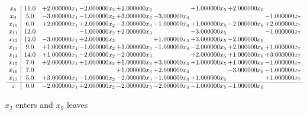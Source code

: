 \documentclass[10pt]{article}
\begin{document}
\[\begin{array}{c| c c@{\hskip 2pt} c@{\hskip 2pt} c@{\hskip 2pt} c@{\hskip 2pt} c@{\hskip 2pt} c@{\hskip 2pt} c@{\hskip 2pt} }
 x_{8}   &  11.0 & + 2.000000 x_{1} & -2.000000 x_{2} & + 2.000000 x_{3} &   & + 1.000000 x_{5} & + 2.000000 x_{6} &   \\
 x_{9}   &  5.0 & -3.000000 x_{1} & -1.000000 x_{2} & + 3.000000 x_{3} & -3.000000 x_{4} &    &   & -1.000000 x_{7}\\
 x_{10}   &  6.0 & + 2.000000 x_{1} & + 2.000000 x_{2} & -3.000000 x_{3} & -1.000000 x_{4} & + 1.000000 x_{5} & -2.000000 x_{6} & + 2.000000 x_{7}\\
 x_{11}   &  12.0  &   & -1.000000 x_{2} & + 2.000000 x_{3} &   & -3.000000 x_{5} &   & -1.000000 x_{7}\\
 x_{12}   &  12.0 & -3.000000 x_{1} & + 2.000000 x_{2} &   & + 1.000000 x_{4} & + 3.000000 x_{5} & -2.000000 x_{6} &   \\
 x_{13}   &  9.0 & + 1.000000 x_{1} & -1.000000 x_{2} & + 3.000000 x_{3} & -1.000000 x_{4} & -2.000000 x_{5} & + 2.000000 x_{6} & + 1.000000 x_{7}\\
 x_{14}   &  14.0 & + 1.000000 x_{1} & -2.000000 x_{2} & -2.000000 x_{3} &   & + 2.000000 x_{5} & + 1.000000 x_{6} & + 3.000000 x_{7}\\
 x_{15}   &  7.0 & + 2.000000 x_{1} & + 1.000000 x_{2} & + 1.000000 x_{3} & + 3.000000 x_{4} & + 1.000000 x_{5} & + 1.000000 x_{6} & -1.000000 x_{7}\\
 x_{16}   &  7.0  &    &   & + 1.000000 x_{3} & + 2.000000 x_{4} &   & -3.000000 x_{6} & -1.000000 x_{7}\\
 x_{17}   &  5.0 & + 3.000000 x_{1} & -1.000000 x_{2} & -2.000000 x_{3} & -1.000000 x_{4} & + 1.000000 x_{5} &   & + 1.000000 x_{7}\\
\hline
z    &  0.0 & -2.000000 x_{1} & + 2.000000 x_{2} & -2.000000 x_{3} & -2.000000 x_{4} & -1.000000 x_{5} & -1.000000 x_{6} &   \\
\end{array}\]


 $ x_{2} $ enters and $ x_{9} $ leaves 
\end{document}
